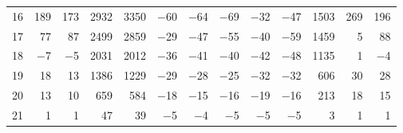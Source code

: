 \begin{table}[H]
\begin{tabular}{crrrrrrrrrrrr}
        16 & 189 & 173 & 2932 & 3350 & $-$60 & $-$64 & $-$69 & $-$32 & $-$47 & 1503 & 269 & 196 \\
        17 & 77 & 87 & 2499 & 2859 & $-$29 & $-$47 & $-$55 & $-$40 & $-$59 & 1459 & 5 & 88 \\
        18 & $-$7 & $-$5 & 2031 & 2012 & $-$36 & $-$41 & $-$40 & $-$42 & $-$48 & 1135 & 1 & $-$4 \\
        19 & 18 & 13 & 1386 & 1229 & $-$29 & $-$28 & $-$25 & $-$32 & $-$32 & 606 & 30 & 28 \\
        20 & 13 & 10 & 659 & 584 & $-$18 & $-$15 & $-$16 & $-$19 & $-$16 & 213 & 18 & 15 \\
        21 & 1 & 1 & 47 & 39 & $-$5 & $-$4 & $-$5 & $-$5 & $-$5 & 3 & 1 & 1 \\
        \hline
    \end{tabular}
\end{table}

